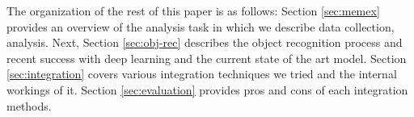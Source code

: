 The organization of the rest of this paper is as follows: Section \ref{sec:memex} provides an overview of the analysis task in which we describe data collection, analysis. Next, Section \ref{sec:obj-rec} describes the object recognition process and recent success with deep learning and the current state of the art model. Section \ref{sec:integration} covers various integration techniques we tried and the internal workings of it. Section \ref{sec:evaluation} provides pros and cons of each integration methods.
